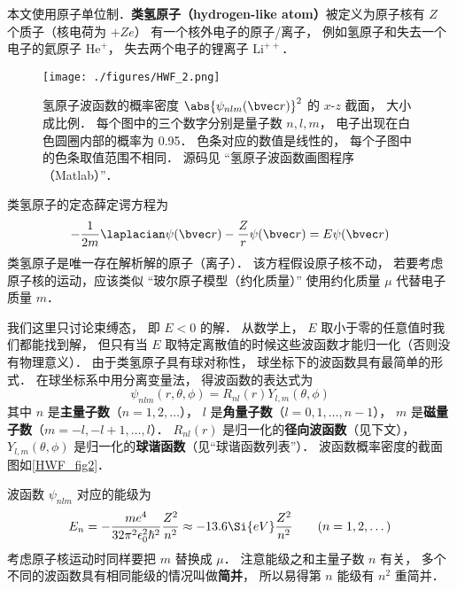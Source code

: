 

本文使用原子单位制．\textbf{类氢原子（hydrogen-like atom）}被定义为原子核有 $Z$ 个质子（核电荷为 $+Ze$） 有一个核外电子的原子/离子， 例如氢原子和失去一个电子的氦原子 $\mathrm{He}^+$， 失去两个电子的锂离子 $\mathrm{Li}^{++}$． %

\begin{figure}[ht]
\centering
\texttt{[image: ./figures/HWF\_2.png]}
\caption{氢原子波函数的概率密度 $\abs{\psi_{nlm}(\bvec r)}^2$ 的 $x$-$z$ 截面， 大小成比例． 每个图中的三个数字分别是量子数 $n, l, m$， 电子出现在白色圆圈内部的概率为 0.95． 色条对应的数值是线性的， 每个子图中的色条取值范围不相同． 源码见 “氢原子波函数画图程序（Matlab）”．} \label{HWF_fig2}
\end{figure}

类氢原子的定态薛定谔方程为
\begin{equation}\label{HWF_eq1}
-\frac{1}{2m} \laplacian \psi(\bvec r) - \frac{Z}{r} \psi(\bvec r) = E \psi(\bvec r)
\end{equation}
类氢原子是唯一存在解析解的原子（离子）． 该方程假设原子核不动， 若要考虑原子核的运动，应该类似 “玻尔原子模型（约化质量）” 使用约化质量 $\mu$ 代替电子质量 $m$．

我们这里只讨论束缚态， 即 $E < 0$ 的解．  从数学上， $E$ 取小于零的任意值时我们都能找到解， 但只有当 $E$ 取特定离散值的时候这些波函数才能归一化（否则没有物理意义）． 由于类氢原子具有球对称性， 球坐标下的波函数具有最简单的形式． 在球坐标系中用分离变量法， 得波函数的表达式为
\begin{equation}\label{HWF_eq3}
\psi_{nlm} (r,\theta ,\phi) = R_{nl}(r) Y_{l,m}(\theta, \phi)
\end{equation}
其中 $n$ 是\textbf{主量子数}（$n = 1, 2, \dots$）， $l$ 是\textbf{角量子数}（$l = 0, 1, \dots, n - 1$）， $m$ 是\textbf{磁量子数}（$m = -l, -l+1, \dots, l$）． $R_{nl}(r)$ 是归一化的\textbf{径向波函数}（见下文）， $Y_{l,m}(\theta, \phi)$ 是归一化的\textbf{球谐函数}（见“球谐函数列表”）． 波函数概率密度的截面图如\autoref{HWF_fig2}．

波函数 $\psi_{nlm}$ 对应的能级为
\begin{equation}\label{HWF_eq5}
E_n =  - \frac{m e^4}{32 \pi^2 \epsilon_0^2 \hbar ^2} \frac{Z^2}{n^2} \approx - 13.6\Si{eV} \frac{Z^2}{n^2}
\qquad (n = 1, 2, \dots)
\end{equation}
考虑原子核运动时同样要把 $m$ 替换成 $\mu$． 注意能级之和主量子数 $n$ 有关， 多个不同的波函数具有相同能级的情况叫做\textbf{简并}， 所以易得第 $n$ 能级有 $n^2$ 重简并．

